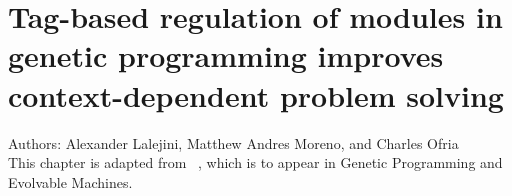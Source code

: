 \chapter{ Tag-based regulation of modules in genetic programming improves context-dependent problem solving }
\label{chapter:tag-based-regulation}



\noindent
Authors: Alexander Lalejini, Matthew Andres Moreno, and Charles Ofria \\
This chapter is adapted from ~\citep{lalejini2020tagbased}, which is to appear in Genetic Programming and Evolvable Machines.







